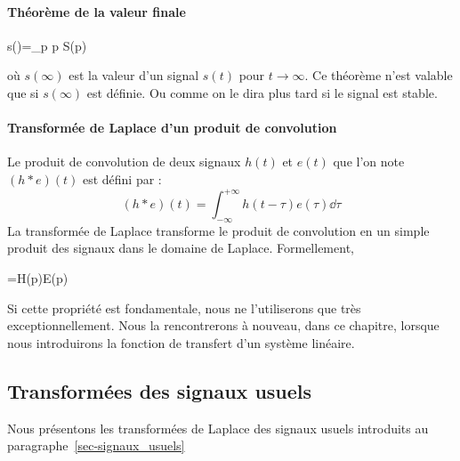 \paragraph{Théorème de la valeur finale}
\begin{bequation}
    s(\infty)=\lim\limits_{p} p S(p)
\end{bequation}
où $s(\infty)$ est la valeur d'un signal $s(t)$ pour $t\to\infty$.
Ce théorème n'est valable que si $s(\infty)$ est définie. Ou comme on le 
dira plus tard si le signal est stable.
\paragraph{Transformée de Laplace d'un produit de convolution}
Le produit de convolution de deux signaux $h(t)$ et $e(t)$ que l'on 
note $(h*e)(t)$ est défini par :
\[
    (h*e)(t)=\int_{-\infty}^{+\infty}h(t-\tau)e(\tau)\dd{\tau}
\]
La transformée de Laplace transforme le produit de convolution en un simple
produit des signaux dans le domaine de Laplace. Formellement,
\begin{bequation}
    =H(p)E(p)
\end{bequation}
Si cette propriété est fondamentale, nous ne l'utiliserons 
que très exceptionnellement. Nous la rencontrerons à nouveau, 
dans ce chapitre, lorsque nous introduirons la fonction de 
transfert d'un système linéaire.
\subsection{Transformées des signaux usuels}
Nous présentons les transformées de Laplace des signaux usuels introduits
au paragraphe~\ref{sec-signaux_usuels}
